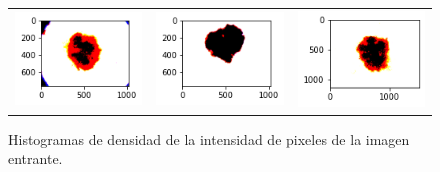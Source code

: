 \begin{figure}[!b]
\begin{tabular}{ccc}
        \includegraphics[width=4cm]{../Plots/THR/filtered_12.png} &
        \includegraphics[width=4cm]{../Plots/THR/filtered_13.png} &
        \includegraphics[width=4cm]{../Plots/THR/filtered_14.png} \\


    \end{tabular}        
    \caption{Histogramas de densidad de la intensidad de pixeles de la imagen entrante.}
    \label{fig:output_1}
\end{figure}



